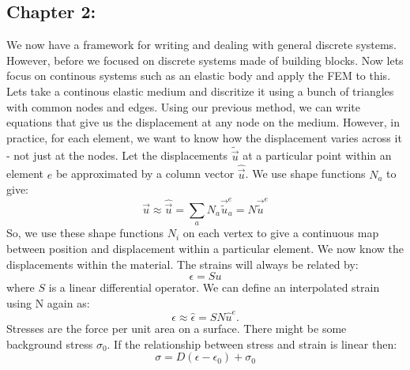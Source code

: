 \documentclass{article}
\begin{document}
\subsection{Chapter 2:}
We now have a framework for writing and dealing with general discrete systems. However, before we focused on discrete systems made of building blocks. Now lets focus on continous systems such as an elastic body and apply the FEM to this. 
\newline
Lets take a continous elastic medium and discritize it using a bunch of triangles with common nodes and edges. Using our previous method, we can write equations that give us the displacement at any node on the medium. However, in practice, for each element, we want to know how the displacement varies across it - not just at the nodes. Let the displacements $\tilde{\vec{u}}$ at a particular point within an element $e$ be approximated by a column vector $\hat{\vec{u}}$. We use shape functions $N_{a}$ to give:
\begin{equation}
	\vec{u} \approx \hat{\vec{u}} = \sum_{a} N_a 
	\vec{\tilde{u}}_a^{e} = N \vec{\tilde{u}}^{e}
\end{equation}
So, we use these shape functions $N_{i}$ on each vertex to give a continuous map between position and displacement within a particular element.
\newline
We now know the displacements within the material. The strains will always be related by:
\begin{equation}
	\epsilon = S u
\end{equation}
where $S$ is a linear differential operator. We can define an interpolated strain using N again as:
\begin{equation}
	\epsilon \approx \hat{\epsilon}= S N \hat{u}^{e}.
\end{equation}
Stresses are the force per unit area on a surface. There might be some background stress $\sigma_0$. If the relationship between stress and strain is linear then:
\begin{equation}
	\sigma = D (\epsilon - \epsilon_0) + \sigma_0
\end{equation}
\newline
\end{document}
